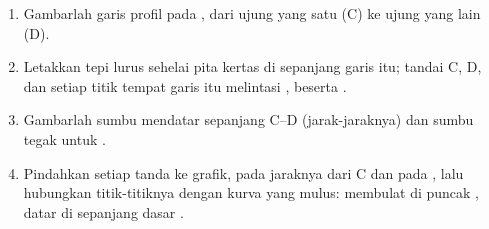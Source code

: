 \begin{method}
\begin{enumerate}
  \item Gambarlah garis profil pada , dari ujung yang satu (C) ke
        ujung yang lain (D).
  \item Letakkan tepi lurus sehelai pita kertas di sepanjang garis itu;
        tandai C, D, dan setiap titik tempat garis itu melintasi , beserta .
  \item Gambarlah sumbu mendatar sepanjang C--D (jarak-jaraknya) dan sumbu
        tegak untuk .
  \item Pindahkan setiap tanda ke grafik, pada jaraknya dari C dan pada
        , lalu hubungkan titik-titiknya dengan kurva yang
        mulus: membulat di puncak , datar di sepanjang dasar .
\end{enumerate}
\end{method}


